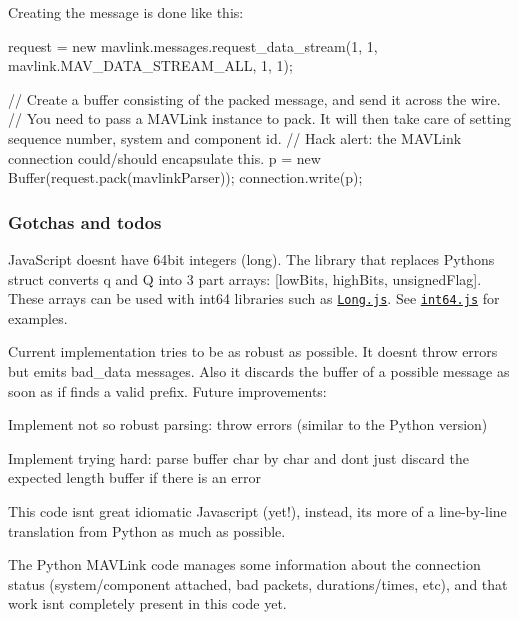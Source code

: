 Creating the message is done like this\+:


\begin{DoxyCode}
request = new mavlink.messages.request\_data\_stream(1, 1, mavlink.MAV\_DATA\_STREAM\_ALL, 1, 1);

// Create a buffer consisting of the packed message, and send it across the wire.
// You need to pass a MAVLink instance to pack. It will then take care of setting sequence number, system
       and component id.
// Hack alert: the MAVLink connection could/should encapsulate this.
p = new Buffer(request.pack(mavlinkParser));
connection.write(p);
\end{DoxyCode}


\subsubsection*{Gotchas and todo\textquotesingle{}s}

Java\+Script doesn\textquotesingle{}t have 64bit integers (long). The library that replaces Pythons struct converts {\ttfamily q} and {\ttfamily Q} into 3 part arrays\+: {\ttfamily \mbox{[}low\+Bits, high\+Bits, unsigned\+Flag\mbox{]}}. These arrays can be used with int64 libraries such as \href{https://github.com/dcodeIO/Long.js}{\tt Long.\+js}. See \href{https://github.com/AndreasAntener/node-jspack/blob/master/test/int64.js}{\tt int64.\+js} for examples.

Current implementation tries to be as robust as possible. It doesn\textquotesingle{}t throw errors but emits bad\+\_\+data messages. Also it discards the buffer of a possible message as soon as if finds a valid prefix. Future improvements\+:
\begin{DoxyItemize}
\item Implement not so robust parsing\+: throw errors (similar to the Python version)
\item Implement trying hard\+: parse buffer char by char and don\textquotesingle{}t just discard the expected length buffer if there is an error
\end{DoxyItemize}

This code isn\textquotesingle{}t great idiomatic Javascript (yet!), instead, it\textquotesingle{}s more of a line-\/by-\/line translation from Python as much as possible.

The Python M\+A\+V\+Link code manages some information about the connection status (system/component attached, bad packets, durations/times, etc), and that work isn\textquotesingle{}t completely present in this code yet.

